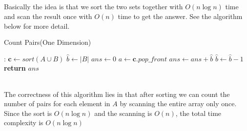 \documentclass[12pt,letterpaper]{article}
\begin{document}
\subsection{}
Basically the idea is that we sort the two sets together with $O(n\log n)$ time and scan the result once with $O(n)$ time to get the answer. See the algorithm below for more detail.
\begin{algorithm}
    \caption{Count Pairs(One Dimension)}\label{alg:count1d}
    \begin{algorithmic}[1]
    :
    \State $\boldsymbol{c}\gets sort(A\cup B)$
    \State $\hat{b}\gets |B|$
    \State $ans\gets 0$
    \State $a\gets\boldsymbol{c}.pop\_front$
    \State $ans\gets ans+\hat{b}$
    \EndIf
    \State $\hat{b}\gets \hat{b}-1$
    \EndIf
    \EndWhile
    \State \textbf{return} $ans$
    \EndProcedure
    \end{algorithmic}
\end{algorithm}\\
The correctness of this algorithm lies in that after sorting we can count the number of pairs for each element in $A$ by scanning the entire array only once. Since the sort is $O(n\log n)$ and the scanning is $O(n)$, the total time complexity is $O(n\log n)$\\
\\
\\
\\
\\
\end{document}

